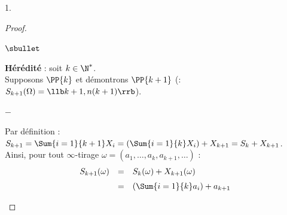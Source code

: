 \documentclass[11pt]{article}%
\begin{document}
\begin{noliste}{1.}
\begin{proof}
\begin{remark}
\begin{noliste}{$\sbullet$}
\begin{noliste}{\fitem}
        \item {\bf Hérédité} : soit $k \in \N^*$.\\
          Supposons $\PP{k}$ et démontrons $\PP{k+1}$ (\ie :
          $S_{k+1}(\Omega) = \llb k+1, n(k+1) \rrb$).%
          \begin{noliste}{$-$}
          \item Par définition : $S_{k+1} = \Sum{i=1}{k+1} X_i =
            \left(\Sum{i=1}{k} X_i \right) + X_{k+1} = S_k + X_{k+1}$.\\[.2cm]
            Ainsi, pour tout $\infty$-tirage $\omega = (a_1, \hdots,
            a_k, a_{k+1}, \hdots)$ :
            \[
            \begin{array}{rcl}
              S_{k+1}(\omega) & = & S_k(\omega) + X_{k+1}(\omega)
              \\[.2cm]
              & = & \left( \Sum{i=1}{k} a_i \right) + a_{k+1}
            \end{array}
            \]


\end{noliste}
\end{noliste}
\end{noliste}
\end{remark}
\end{proof}
\end{noliste}
\end{document}
